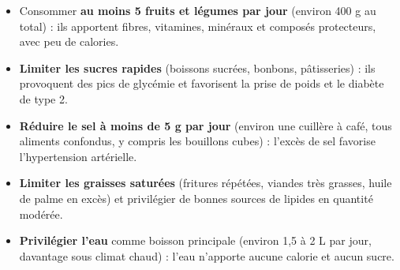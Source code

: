 \documentclass[11pt]{article}
\begin{document}
\begin{propriete}
\begin{itemize}
\item Consommer \textbf{au moins 5 fruits et légumes par jour} (environ 400 g au total) : ils apportent fibres, vitamines, minéraux et composés protecteurs, avec peu de calories.
\item \textbf{Limiter les sucres rapides} (boissons sucrées, bonbons, pâtisseries) : ils provoquent des pics de glycémie et favorisent la prise de poids et le diabète de type 2.
\item \textbf{Réduire le sel à moins de 5 g par jour} (environ une cuillère à café, tous aliments confondus, y compris les bouillons cubes) : l'excès de sel favorise l'hypertension artérielle.
\item \textbf{Limiter les graisses saturées} (fritures répétées, viandes très grasses, huile de palme en excès) et privilégier de bonnes sources de lipides en quantité modérée.
\item \textbf{Privilégier l'eau} comme boisson principale (environ 1,5 à 2 L par jour, davantage sous climat chaud) : l'eau n'apporte aucune calorie et aucun sucre.
\end{itemize}
\end{propriete}
\end{document}
